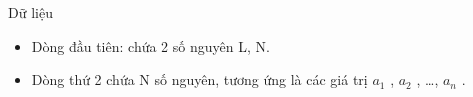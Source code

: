 Dữ liệu
\begin{itemize}
	\item     Dòng đầu tiên: chứa 2 số nguyên L, N.   
	\item     Dòng thứ 2 chứa N số nguyên, tương ứng là các giá trị $a_{1}$    , $a_{2}$    , …, $a_{n}$    .   
\end{itemize}